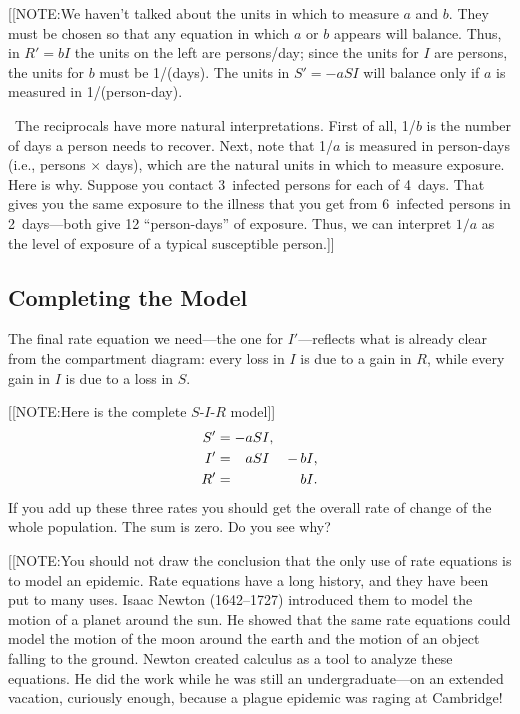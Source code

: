 \setlength{\unitlength}{1pt}

[[NOTE:We haven't talked about the units in which to measure $a$ and
  $b$.  They must be chosen so that any equation in which $a$ or $b$
  appears will balance.  Thus, in $R' = bI$ the units on the left are
  persons/day; since the units for $I$ are persons, the units for $b$
  must be 1/(days).  The units in $S' = -aSI$ will balance only if $a$
  is measured in 1/(person-day).

\quad\ The reciprocals have more natural interpretations.  First of
all, 1/$b$ is the number of days a person needs to recover.  Next,
note that 1/$a$ is measured in person-days (i.e., persons $\times$
days), which are the natural units in which to measure exposure.  Here
is why.  Suppose you contact 3~infected persons for each of 4~days.
That gives you the same exposure to the illness that you get from
6~infected persons in 2~days---both give 12 ``person-days'' of
exposure.  Thus, we can interpret $1/a$ as the level of exposure of a
typical susceptible person.]]


\subsection{Completing the Model}
\label{subsec:completing-the-model}

The final rate equation we need---the one for $I'$---reflects what is
already clear from the compartment diagram: every loss in $I$ is due
to a gain in $R$, while every gain in $I$ is due to a loss in $S$.



\mbox{}
[[NOTE:Here is the complete $S$-$I$-$R$ model]]
\begin{alignat*}{2}
		S' &=  -a S I,           &    &     \\
		I' &=  \hphantom{-}a S I &-\, & b I,  \\
		R' &=                    &    & b I.
\end{alignat*}
If you add up these three rates you should get the overall rate of
change of the whole population.  The sum is zero.  Do you see why?

[[NOTE:You should not draw the conclusion that the only use of rate
  equations is to model an epidemic.  Rate
  equations have a long history, and they have been put to many uses.
  Isaac Newton (1642--1727) introduced them to model
  the motion of a planet around the sun.  He showed that the same rate
  equations could model the motion of the moon around the earth and
  the motion of an object falling to the ground.  Newton created
  calculus as a tool to analyze these equations.  He did the work
  while he was still an undergraduate---on an extended vacation,
  curiously enough, because a plague epidemic was raging at Cambridge!

